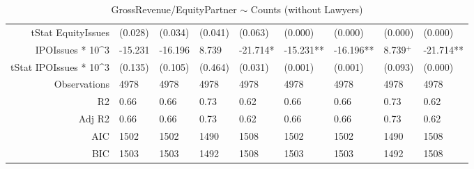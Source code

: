 \begin{table}[ht]
\begin{tabular}{rllllllll}
  tStat EquityIssues & (0.028) & (0.034) & (0.041) & (0.063) & (0.000) & (0.000) & (0.000) & (0.000) \\ 
  IPOIssues * 10^3 & -15.231 & -16.196 & 8.739 & -21.714* & -15.231** & -16.196** & 8.739$^{+}$ & -21.714** \\ 
  tStat IPOIssues * 10^3 & (0.135) & (0.105) & (0.464) & (0.031) & (0.001) & (0.001) & (0.093) & (0.000) \\ 
  Observations & 4978 & 4978 & 4978 & 4978 & 4978 & 4978 & 4978 & 4978 \\ 
  R2 & 0.66 & 0.66 & 0.73 & 0.62 & 0.66 & 0.66 & 0.73 & 0.62 \\ 
  Adj R2 & 0.66 & 0.66 & 0.73 & 0.62 & 0.66 & 0.66 & 0.73 & 0.62 \\ 
  AIC & 1502 & 1502 & 1490 & 1508 & 1502 & 1502 & 1490 & 1508 \\ 
  BIC & 1503 & 1503 & 1492 & 1508 & 1503 & 1503 & 1492 & 1508 \\ 
   \hline
\end{tabular}
\caption{GrossRevenue/EquityPartner $\sim$ Counts (without Lawyers)} 
\end{table}
